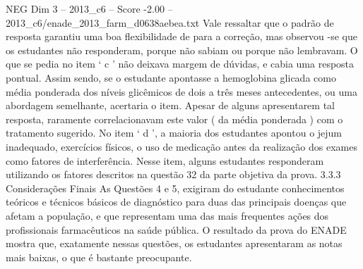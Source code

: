 \begin{textsample}{NEG Dim 3 – 2013\_c6 – Score -2.00 – 2013\_c6/enade\_2013\_farm\_d0638aebea.txt}
Vale ressaltar que o padrão de resposta garantiu uma boa flexibilidade de para a correção, mas observou -se que os estudantes não responderam, porque não sabiam ou porque não lembravam.
O que se pedia no item ‘ c ’ não deixava margem de dúvidas, e cabia uma resposta pontual.
Assim sendo, se o estudante apontasse a hemoglobina glicada como média ponderada dos níveis glicêmicos de dois a três meses antecedentes, ou uma abordagem semelhante, acertaria o item.
Apesar de alguns apresentarem tal resposta, raramente correlacionavam este valor ( da média ponderada ) com o tratamento sugerido.
No item ‘ d ’, a maioria dos estudantes apontou o jejum inadequado, exercícios físicos, o uso de medicação antes da realização dos exames como fatores de interferência.
Nesse item, alguns estudantes responderam utilizando os fatores descritos na questão 32 da parte objetiva da prova. 3.3.3 Considerações Finais As Questões 4 e 5, exigiram do estudante conhecimentos teóricos e técnicos básicos de diagnóstico para duas das principais doenças que afetam a população, e que representam uma das mais frequentes ações dos profissionais farmacêuticos na saúde pública.
O resultado da prova do ENADE mostra que, exatamente nessas questões, os estudantes apresentaram as notas mais baixas, o que é bastante preocupante.

\end{textsample}
